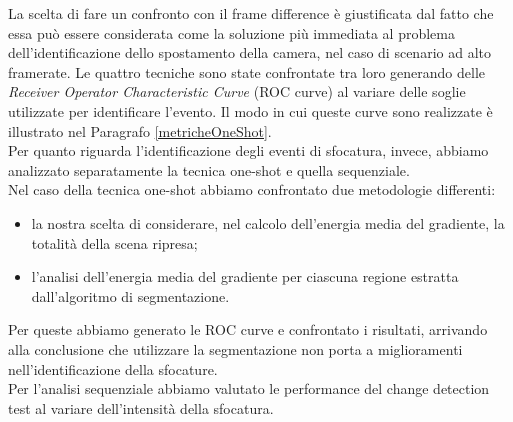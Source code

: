 La scelta di fare un confronto con il frame difference \`e giustificata dal fatto che essa pu\`o essere considerata come la soluzione pi\`u immediata al problema dell'identificazione dello spostamento della camera, nel caso di scenario ad alto framerate.
Le quattro tecniche sono state confrontate tra loro generando delle \textit{Receiver Operator Characteristic Curve} (ROC curve) al variare delle soglie utilizzate per identificare l'evento.
Il modo in cui queste curve sono realizzate \`e illustrato nel Paragrafo \ref{metricheOneShot}.\\
Per quanto riguarda l'identificazione degli eventi di sfocatura, invece, abbiamo analizzato separatamente la tecnica one-shot e quella sequenziale.\\
Nel caso della tecnica one-shot abbiamo confrontato due metodologie differenti:
\begin{itemize}
	 \item la nostra scelta di considerare, nel calcolo dell'energia media del gradiente, la totalit\`a della scena ripresa;
	 \item l'analisi dell'energia media del gradiente per ciascuna regione estratta dall'algoritmo di segmentazione.
\end{itemize}
Per queste abbiamo generato le ROC curve e confrontato i risultati, arrivando alla conclusione che utilizzare la segmentazione non porta a miglioramenti nell'identificazione della sfocature.\\
Per l'analisi sequenziale abbiamo valutato le performance del change detection test al variare dell'intensit\`a della sfocatura. 
